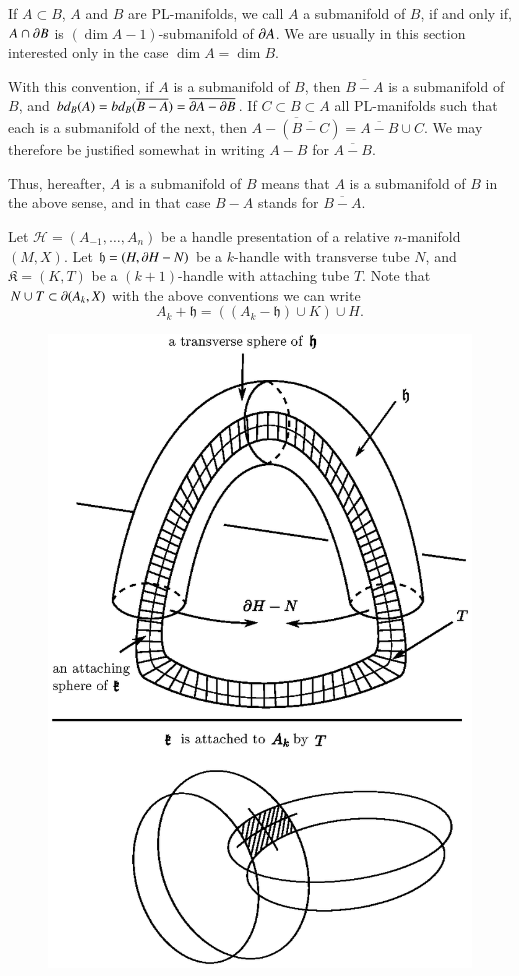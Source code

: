 If $A\subset B$, $A$ and $B$ are PL-manifolds, we call $A$ a submanifold of $B$, if and only if, $A\cap \partial B$ is $(\dim A-1)$-submanifold of $\partial A$. We are usually in this section interested only in the case $\dim A=\dim B$.

With this convention, if $A$ is a submanifold of $B$, then $\overline{B-A}$ is a submanifold of $B$, and $bd_{B}(A)=bd_{B}(\overline{B-A})=\overline{\partial A-\partial B}$. If $C\subset B\subset A$ all PL-manifolds such that each is a submanifold of the next, then $\overline{A-(\overline{B-C})}=\overline{A-B}\cup C$. We may therefore be justified somewhat in writing $A-B$ for $\overline{A-B}$.

Thus, hereafter, $A$ is a submanifold of $B$ means that $A$ is a submanifold of $B$ in the above sense, and in that case $B-A$ stands for $\overline{B-A}$.

Let $\mathscr{H}=(A_{-1},\ldots,A_{n})$ be a handle presentation of a relative $n$-manifold $(M,X)$. Let $\mathfrak{h}=(H,\partial H-N)$ be a $k$-handle with transverse tube $N$, and $\mathfrak{K}=(K,T)$ be a $(k+1)$-handle with attaching tube $T$. Note that $N\cup T\subset \partial (A_{k},X)$ with the above conventions we can write
$$
A_{k}+\mathfrak{h}=((A_{k}-\mathfrak{h})\cup K)\cup H.
$$

\newpage

\begin{figure}[H]
\centering
\includegraphics{figure/fig25.eps}
\end{figure}\pageoriginale 


